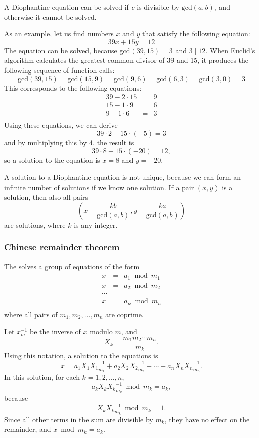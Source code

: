 A Diophantine equation can be solved if
$c$ is divisible by
$\textrm{gcd}(a,b)$,
and otherwise it cannot be solved.

As an example, let us find numbers $x$ and $y$
that satisfy the following equation:
\[
39x + 15y = 12
\]
The equation can be solved, because
$\textrm{gcd}(39,15)=3$ and $3 \mid 12$.
When Euclid's algorithm calculates the
greatest common divisor of 39 and 15,
it produces the following sequence of function calls:
\[
\textrm{gcd}(39,15) = \textrm{gcd}(15,9)
= \textrm{gcd}(9,6) = \textrm{gcd}(6,3)
= \textrm{gcd}(3,0) = 3 \]
This corresponds to the following equations:
\[
\begin{array}{lcl}
39 - 2 \cdot 15 & = & 9 \\
15 - 1 \cdot 9 & = & 6 \\
9 - 1 \cdot 6 & = & 3 \\
\end{array}
\]
Using these equations, we can derive
\[
39 \cdot 2 + 15 \cdot (-5) = 3
\]
and by multiplying this by 4, the result is
\[
39 \cdot 8 + 15 \cdot (-20) = 12,
\]
so a solution to the equation is
$x=8$ and $y=-20$.

A solution to a Diophantine equation is not unique,
because we can form an infinite number of solutions
if we know one solution.
If a pair $(x,y)$ is a solution, then also all pairs
\[(x+\frac{kb}{\textrm{gcd}(a,b)},y-\frac{ka}{\textrm{gcd}(a,b)})\]
are solutions, where $k$ is any integer.

\subsubsection{Chinese remainder theorem}


The  solves
a group of equations of the form
\[
\begin{array}{lcl}
x & = & a_1 \bmod m_1 \\
x & = & a_2 \bmod m_2 \\
\cdots \\
x & = & a_n \bmod m_n \\
\end{array}
\]
where all pairs of $m_1,m_2,\ldots,m_n$ are coprime.

Let $x^{-1}_m$ be the inverse of $x$ modulo $m$, and
\[ X_k = \frac{m_1 m_2 \cdots m_n}{m_k}.\]
Using this notation, a solution to the equations is
\[x = a_1 X_1 {X_1}^{-1}_{m_1} + a_2 X_2 {X_2}^{-1}_{m_2} + \cdots + a_n X_n {X_n}^{-1}_{m_n}.\]
In this solution, for each $k=1,2,\ldots,n$,
\[a_k X_k {X_k}^{-1}_{m_k} \bmod m_k = a_k,\]
because
\[X_k {X_k}^{-1}_{m_k} \bmod m_k = 1.\]
Since all other terms in the sum are divisible by $m_k$,
they have no effect on the remainder,
and $x \bmod m_k = a_k$.

